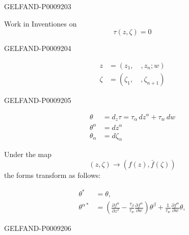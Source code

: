 \begin{GelfandAdjacentEvidence}{GELFAND-P000920}{3}


Work in Inventiones on 
\begin{equation*}
 \tau(z,\zeta)=0
 \tag{16}
\end{equation*}

\end{GelfandAdjacentEvidence}
\begin{GelfandAdjacentEvidence}{GELFAND-P000920}{4}


\begin{align*}
 z&=(z_1,\quad,z_n;w)\\
 \zeta&=(\zeta_1,\quad,\zeta_{n+1})
\end{align*}
\end{GelfandAdjacentEvidence}
\begin{GelfandAdjacentEvidence}{GELFAND-P000920}{5}


\begin{align*}
 \theta&=d_z\tau=\tau_\alpha\,dz^\alpha+\tau_w\,dw\\
 \theta^\alpha&=dz^\alpha\\
 \theta_\alpha&=d\zeta_\alpha
\end{align*}

Under the map
\begin{equation*}
 (z,\zeta)\to(f(z),\bar f(\zeta))
 \tag{17}
\end{equation*}
the forms transform as follows:

\begin{equation*}
 \begin{aligned}
 \theta^*&=\theta,\\
 \theta^{\alpha*}&=\left(\frac{\partial f^\alpha}{\partial z^\beta}
       -\frac{\tau_\beta}{\tau_w}\frac{\partial f^\alpha}{\partial w}\right)\theta^\beta
       +\frac{1}{\tau_w}\frac{\partial f^\alpha}{\partial w}\theta,
 \end{aligned}
 \tag{18}
\end{equation*}
\end{GelfandAdjacentEvidence}
\begin{GelfandAdjacentEvidence}{GELFAND-P000920}{6}

\end{GelfandAdjacentEvidence}
